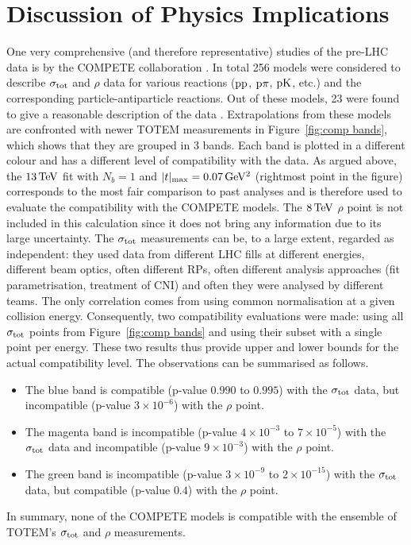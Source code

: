 \section{Discussion of Physics Implications}
\label{sec:discussion}

One very comprehensive (and therefore representative) studies of the pre-LHC data is by the COMPETE collaboration \cite{compete}. In total 256 models were considered to describe $\sigma_{\rm tot}$ and $\rho$ data for various reactions ($\rm pp$, $\rm p\pi$, $\rm pK$, etc.) and the corresponding particle-antiparticle reactions. Out of these models, 23 were found to give a reasonable description of the data \cite{compete-details}. Extrapolations from these models are confronted with newer TOTEM measurements in Figure~\ref{fig:comp bands}, which shows that they are grouped in 3 bands. Each band is plotted in a different colour and has a different level of compatibility with the data. As argued above, the $13\,{\rm TeV}$ fit with $N_b=1$ and $|t|_{\rm max} = 0.07\,{\rm GeV^2}$ (rightmost point in the figure) corresponds to the most fair comparison to past analyses and is therefore used to evaluate the compatibility with the COMPETE models. The $8\,{\rm TeV}$ $\rho$ point is not included in this calculation since it does not bring any information due to its large uncertainty. The $\sigma_{\rm tot}$ measurements can be, to a large extent, regarded as independent: they used data from different LHC fills at different energies, different beam optics, often different RPs, often different analysis approaches (fit parametrisation, treatment of CNI) and often they were analysed by different teams. The only correlation comes from using common normalisation at a given collision energy. Consequently, two compatibility evaluations were made: using all $\sigma_{\rm tot}$ points from Figure~\ref{fig:comp bands} and using their subset with a single point per energy. These two results thus provide upper and lower bounds for the actual compatibility level. The observations can be summarised as follows.
\begin{itemize}[noitemsep,topsep=0pt]
\item The blue band is compatible (p-value $0.990$ to $0.995$) with the $\sigma_{\rm tot}$ data, but incompatible (p-value $3\times10^{-6}$) with the $\rho$ point.
\item The magenta band is incompatible (p-value $4\times10^{-3}$ to $7\times10^{-5}$) with the $\sigma_{\rm tot}$ data and incompatible (p-value $9\times10^{-3}$) with the $\rho$ point.
\item The green band is incompatible (p-value $3\times10^{-9}$ to $2\times10^{-15}$) with the $\sigma_{\rm tot}$ data, but compatible (p-value $0.4$) with the $\rho$ point.
\end{itemize}
In summary, none of the COMPETE models is compatible with the ensemble of TOTEM's $\sigma_{\rm tot}$ and $\rho$ measurements.

